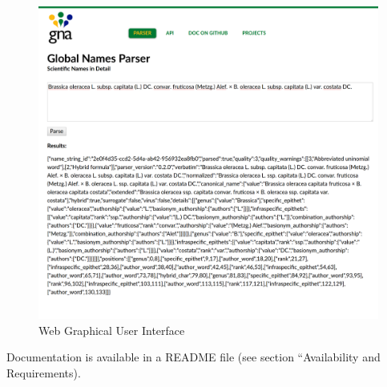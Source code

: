 \documentclass{bmcart}
\begin{document}
\begin{figure}[htbp]
  \begin{center}
    \caption{
      Web Graphical User Interface
    }\label{figure:webgui}
    \vspace{5mm}

    \includegraphics[scale=0.175]{images/web_gui.png}
  \end{center}
\end{figure}


Documentation is available in a README file (see section ``Availability and
Requirements).
\end{document}
